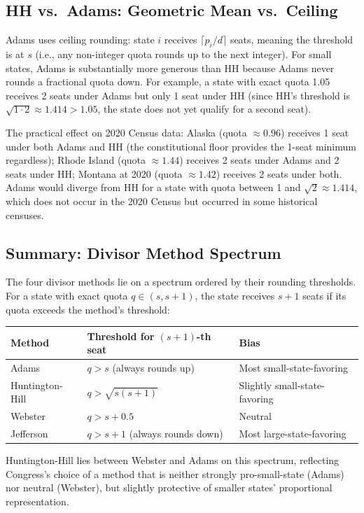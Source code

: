 \subsection{HH vs.\ Adams: Geometric Mean vs.\ Ceiling}

Adams uses ceiling rounding: state $i$ receives $\lceil p_i/d \rceil$
seats, meaning the threshold is at $s$ (i.e., any non-integer quota
rounds up to the next integer).
For small states, Adams is substantially more generous than HH
because Adams never rounds a fractional quota down.
For example, a state with exact quota 1.05 receives 2 seats under Adams
but only 1 seat under HH (since HH's threshold is $\sqrt{1\cdot 2}
\approx 1.414 > 1.05$, the state does not yet qualify for a second seat).

The practical effect on 2020 Census data: Alaska (quota $\approx 0.96$)
receives 1 seat under both Adams and HH (the constitutional floor provides
the 1-seat minimum regardless); Rhode Island (quota $\approx 1.44$)
receives 2 seats under Adams and 2 seats under HH;
Montana at 2020 (quota $\approx 1.42$) receives 2 seats under both.
Adams would diverge from HH for a state with quota between 1 and $\sqrt{2}
\approx 1.414$, which does not occur in the 2020 Census but occurred in
some historical censuses.

\subsection{Summary: Divisor Method Spectrum}

The four divisor methods lie on a spectrum ordered by their rounding
thresholds.
For a state with exact quota $q \in (s, s+1)$, the state receives $s+1$
seats if its quota exceeds the method's threshold:

\begin{center}
\begin{tabular}{lll}
\toprule
Method & Threshold for $(s+1)$-th seat & Bias \\
\midrule
Adams           & $q > s$ (always rounds up)     & Most small-state-favoring \\
Huntington-Hill & $q > \sqrt{s(s+1)}$            & Slightly small-state-favoring \\
Webster         & $q > s + 0.5$                  & Neutral \\
Jefferson       & $q > s + 1$ (always rounds down) & Most large-state-favoring \\
\bottomrule
\end{tabular}
\end{center}

Huntington-Hill lies between Webster and Adams on this spectrum,
reflecting Congress's choice of a method that is neither strongly
pro-small-state (Adams) nor neutral (Webster),
but slightly protective of smaller states' proportional representation.
